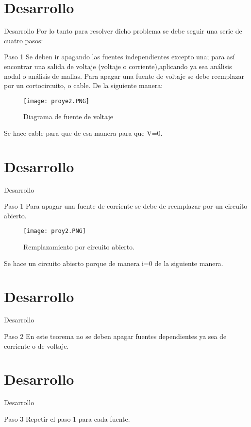 \documentclass[11pt]{beamer}
\begin{document}
      \section{Desarrollo}
      \begin{frame}{Desarrollo}
      Por lo tanto para resolver dicho problema se debe seguir una serie de cuatro pasos:
      \begin{block}{Paso 1}
\justifying
Se deben ir apagando las fuentes independientes excepto una; para así encontrar una salida de voltaje (voltaje o corriente),aplicando ya sea análisis nodal o análisis de mallas. 
Para apagar una fuente de voltaje se debe reemplazar por un cortocircuito, o cable. De la siguiente manera:
\begin{figure}[hbtp]
\caption{Diagrama de fuente de voltaje}
\centering
\texttt{[image: proye2.PNG]}
\end{figure}
Se hace cable  para que de esa manera para que V=0.
\end{block}
      \end{frame}
       
       \section{Desarrollo}
      \begin{frame}{Desarrollo}
      \begin{block}{Paso 1}
\justifying
Para apagar una fuente de corriente se debe de reemplazar por un circuito abierto. 
\begin{figure}[hbtp]
\caption{Remplazamiento por circuito abierto.}
\centering
\texttt{[image: proy2.PNG]}
\end{figure}
Se hace un circuito abierto porque de manera i=0 de la siguiente manera.
\end{block}
      \end{frame}
      
      \section{Desarrollo}
      \begin{frame}{Desarrollo}
      \begin{block}{Paso 2}
\justifying
En este teorema no se deben apagar fuentes dependientes ya sea de corriente o de voltaje.
\end{block}
      \end{frame}
     
      \section{Desarrollo}
      \begin{frame}{Desarrollo}
       \begin{block}{Paso 3}
\justifying
Repetir el paso 1 para cada fuente.
\end{block}
      \end{frame}      
      
\end{document}
